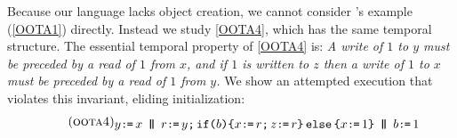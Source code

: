 \begin{example}
  \label{ex:lochb}
  Because our language lacks object creation, we cannot consider
  \citeauthor{DBLP:journals/toplas/Lochbihler13}'s example (\ref{OOTA1}) directly.  Instead we study \ref{OOTA4}, which has the same
  temporal structure.
  The essential temporal property of
  \ref{OOTA4} is: \emph{A write of $1$ to $y$ must be preceded by a read of
    $1$ from $x$, and if $1$ is written to $z$ then a write of $1$ to $x$
    must be preceded by a read of $1$ from $y$.}
  We show an attempted execution that violates this invariant, eliding
  initialization:
\begin{gather}
  \label{OOTA4}\tag{\textsc{oota4}}
  \begin{gathered}
    y\GETS x
  \PAR
  r\GETS y \SEMI \IF{b}\THEN  x\GETS r \SEMI z\GETS r \ELSE x\GETS1 \FI
  \PAR
    b\GETS1
  \\[-1ex]

\end{gathered}
\end{gather}
\end{example}
